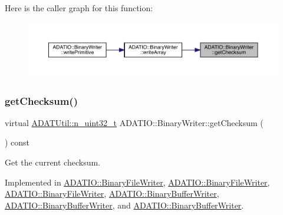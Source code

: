 Here is the caller graph for this function\+:
\nopagebreak
\begin{figure}[H]
\begin{center}
\leavevmode
\includegraphics[width=350pt]{db/dee/classADATIO_1_1BinaryWriter_a8bebb70a7248b14c8a4dcf7aa49c1503_icgraph}
\end{center}
\end{figure}
\mbox{\label{classADATIO_1_1BinaryWriter_a8bebb70a7248b14c8a4dcf7aa49c1503}} 
\subsubsection{\texorpdfstring{getChecksum()}{getChecksum()}\hspace{0.1cm}{\footnotesize\ttfamily [2/3]}}
{\footnotesize\ttfamily virtual \mbox{\hyperlink{namespaceADATUtil_ad945a8afa4db2d1f89b731964adae97e}{A\+D\+A\+T\+Util\+::n\+\_\+uint32\+\_\+t}} A\+D\+A\+T\+I\+O\+::\+Binary\+Writer\+::get\+Checksum (\begin{DoxyParamCaption}{ }\end{DoxyParamCaption}) const\hspace{0.3cm}{\ttfamily [pure virtual]}}



Get the current checksum. 



Implemented in \mbox{\hyperlink{classADATIO_1_1BinaryFileWriter_ad6f9d995a02d4b3e8e12ad18972d58a5}{A\+D\+A\+T\+I\+O\+::\+Binary\+File\+Writer}}, \mbox{\hyperlink{classADATIO_1_1BinaryFileWriter_ad6f9d995a02d4b3e8e12ad18972d58a5}{A\+D\+A\+T\+I\+O\+::\+Binary\+File\+Writer}}, \mbox{\hyperlink{classADATIO_1_1BinaryFileWriter_ad6f9d995a02d4b3e8e12ad18972d58a5}{A\+D\+A\+T\+I\+O\+::\+Binary\+File\+Writer}}, \mbox{\hyperlink{classADATIO_1_1BinaryBufferWriter_a3d7ec1583f03981f0a84571646be46f3}{A\+D\+A\+T\+I\+O\+::\+Binary\+Buffer\+Writer}}, \mbox{\hyperlink{classADATIO_1_1BinaryBufferWriter_a3d7ec1583f03981f0a84571646be46f3}{A\+D\+A\+T\+I\+O\+::\+Binary\+Buffer\+Writer}}, and \mbox{\hyperlink{classADATIO_1_1BinaryBufferWriter_a3d7ec1583f03981f0a84571646be46f3}{A\+D\+A\+T\+I\+O\+::\+Binary\+Buffer\+Writer}}.


